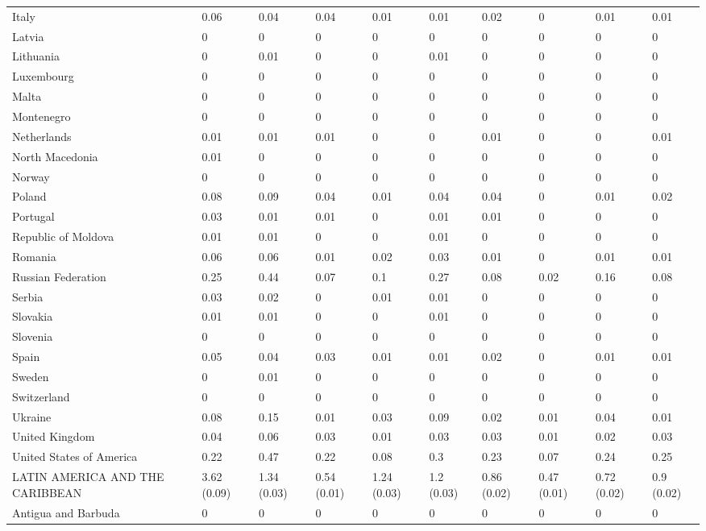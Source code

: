 \begin{longtable}[t]{llllllllll}
Italy & 0.06 & 0.04 & 0.04 & 0.01 & 0.01 & 0.02 & 0 & 0.01 & 0.01\\
Latvia & 0 & 0 & 0 & 0 & 0 & 0 & 0 & 0 & 0\\
Lithuania & 0 & 0.01 & 0 & 0 & 0.01 & 0 & 0 & 0 & 0\\
Luxembourg & 0 & 0 & 0 & 0 & 0 & 0 & 0 & 0 & 0\\
Malta & 0 & 0 & 0 & 0 & 0 & 0 & 0 & 0 & 0\\
Montenegro & 0 & 0 & 0 & 0 & 0 & 0 & 0 & 0 & 0\\
Netherlands & 0.01 & 0.01 & 0.01 & 0 & 0 & 0.01 & 0 & 0 & 0.01\\
North Macedonia & 0.01 & 0 & 0 & 0 & 0 & 0 & 0 & 0 & 0\\
Norway & 0 & 0 & 0 & 0 & 0 & 0 & 0 & 0 & 0\\
Poland & 0.08 & 0.09 & 0.04 & 0.01 & 0.04 & 0.04 & 0 & 0.01 & 0.02\\
Portugal & 0.03 & 0.01 & 0.01 & 0 & 0.01 & 0.01 & 0 & 0 & 0\\
Republic of Moldova & 0.01 & 0.01 & 0 & 0 & 0.01 & 0 & 0 & 0 & 0\\
Romania & 0.06 & 0.06 & 0.01 & 0.02 & 0.03 & 0.01 & 0 & 0.01 & 0.01\\
Russian Federation & 0.25 & 0.44 & 0.07 & 0.1 & 0.27 & 0.08 & 0.02 & 0.16 & 0.08\\
Serbia & 0.03 & 0.02 & 0 & 0.01 & 0.01 & 0 & 0 & 0 & 0\\
Slovakia & 0.01 & 0.01 & 0 & 0 & 0.01 & 0 & 0 & 0 & 0\\
Slovenia & 0 & 0 & 0 & 0 & 0 & 0 & 0 & 0 & 0\\
Spain & 0.05 & 0.04 & 0.03 & 0.01 & 0.01 & 0.02 & 0 & 0.01 & 0.01\\
Sweden & 0 & 0.01 & 0 & 0 & 0 & 0 & 0 & 0 & 0\\
Switzerland & 0 & 0 & 0 & 0 & 0 & 0 & 0 & 0 & 0\\
Ukraine & 0.08 & 0.15 & 0.01 & 0.03 & 0.09 & 0.02 & 0.01 & 0.04 & 0.01\\
United Kingdom & 0.04 & 0.06 & 0.03 & 0.01 & 0.03 & 0.03 & 0.01 & 0.02 & 0.03\\
United States of America & 0.22 & 0.47 & 0.22 & 0.08 & 0.3 & 0.23 & 0.07 & 0.24 & 0.25\\
LATIN AMERICA AND THE CARIBBEAN & 3.62 (0.09) & 1.34 (0.03) & 0.54 (0.01) & 1.24 (0.03) & 1.2 (0.03) & 0.86 (0.02) & 0.47 (0.01) & 0.72 (0.02) & 0.9 (0.02)\\
Antigua and Barbuda & 0 & 0 & 0 & 0 & 0 & 0 & 0 & 0 & 0\\

\end{longtable}
